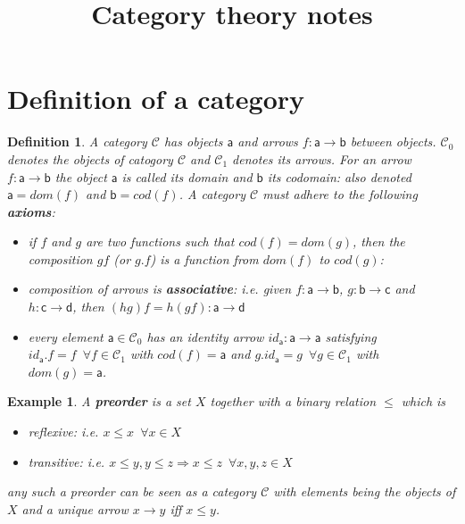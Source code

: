 \documentclass{article}
\newcommand{\cat}[1]{\mathcal{#1}} %
\newcommand{\cato}[1]{\cat{#1}_0} %
\newcommand{\catm}[1]{\cat{#1}_1} %
\newcommand{\ob}[1]{\mathsf{#1}} %
\newcommand{\all}{\enspace \forall}
\newcommand{\allin}[2]{\all #1 \in #2}
\newtheorem{definition}[theorem]{Definition}
\newtheorem{example}[theorem]{Example}
\begin{document}
\title {Category theory notes}
\maketitle

\section{Definition of a category}
\begin{definition}
	A category $\cat{C}$ has objects $\ob{a}$ and arrows $f: \ob{a} \rightarrow \ob{b}$ between objects.
	$\cato{C}$ denotes the objects of catogory $\cat{C}$ and $\catm{C}$ denotes its arrows.
	For an arrow $f: \ob{a} \rightarrow \ob{b}$ the object $\ob{a}$ is called its domain and $\ob{b}$ its codomain: also denoted $\ob{a} = dom(f)$ and $\ob{b} = cod(f)$.
	A category $\cat{C}$ must adhere to the following \textbf{axioms}:
	\begin{itemize}
		\item if $f$ and $g$ are two functions such that $cod(f)=dom(g)$, then the composition $gf$ (or $g.f$) is a function from $dom(f)$ to $cod(g)$:

		\item composition of arrows is \textbf{associative}: i.e. given $f: \ob{a} \rightarrow \ob{b}$, $g: \ob{b} \rightarrow \ob{c}$ and $h: \ob{c} \rightarrow \ob{d}$, then $(hg)f = h(gf): \ob{a} \rightarrow \ob{d}$
		\item every element $\ob{a} \in \cato{C}$ has an identity arrow $id_{\ob{a}}: \ob{a} \rightarrow \ob{a}$ satisfying $id_{\ob{a}}.f = f \allin{f}{\catm{C}}$ with $cod(f)=\ob{a}$ and
		$g.id_{\ob{a}} = g \allin{g}{\catm{C}}$ with $dom(g)=\ob{a}$.
	\end{itemize}
\end{definition}


\begin{example}

	A \textbf{preorder} is a set $X$ together with a binary relation $\leq$ which is
	\begin{itemize}
		\item reflexive: i.e. $x \leq x \allin{x}{X} $
		\item transitive: i.e. $x \leq y, y \leq z \Rightarrow x \leq z \allin{x,y,z}{X}$
	\end{itemize}
	any such a preorder can be seen as a category $\cat{C}$ with elements being the objects of $X$ and a unique arrow $x \rightarrow y$ iff $x \leq y$.

\end{example}
\end{document}
